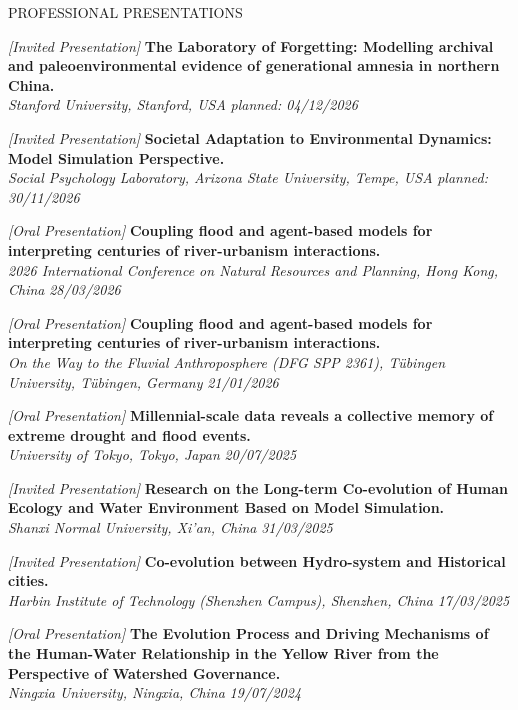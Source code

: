 \documentclass{resume} %
\newcommand{\projectentry}[4]{\textit{[#1]} {\bf #2} \\ \textnormal{\em #3} \hfill {\em #4}}
\begin{document}
\begin{rSection}{PROFESSIONAL PRESENTATIONS}

    \projectentry{Invited Presentation}{The Laboratory of Forgetting: Modelling archival and paleoenvironmental evidence of generational amnesia in northern China.}{Stanford University, Stanford, USA}{planned: 04/12/2026}

    \projectentry{Invited Presentation}{Societal Adaptation to Environmental Dynamics: Model Simulation Perspective.}{Social Psychology Laboratory, Arizona State University, Tempe, USA}{planned: 30/11/2026}

    \projectentry{Oral Presentation}{Coupling flood and agent-based models for interpreting centuries of river-urbanism interactions.}{2026 International Conference on Natural Resources and Planning, Hong Kong, China}{28/03/2026}

    \projectentry{Oral Presentation}{Coupling flood and agent-based models for interpreting centuries of river-urbanism interactions.}{On the Way to the Fluvial Anthroposphere (DFG SPP 2361), Tübingen University, Tübingen, Germany}{21/01/2026}

    \projectentry{Oral Presentation}{Millennial-scale data reveals a collective memory of extreme drought and flood events.}{University of Tokyo, Tokyo, Japan}{20/07/2025}

    \projectentry{Invited Presentation}{Research on the Long-term Co-evolution of Human Ecology and Water Environment Based on Model Simulation.}{Shanxi Normal University, Xi'an, China}{31/03/2025}

    \projectentry{Invited Presentation}{Co-evolution between Hydro-system and Historical cities.}{Harbin Institute of Technology (Shenzhen Campus), Shenzhen, China}{17/03/2025}

    \projectentry{Oral Presentation}{The Evolution Process and Driving Mechanisms of the Human-Water Relationship in the Yellow River from the Perspective of Watershed Governance.}{Ningxia University, Ningxia, China}{19/07/2024}


\end{rSection}
\end{document}
